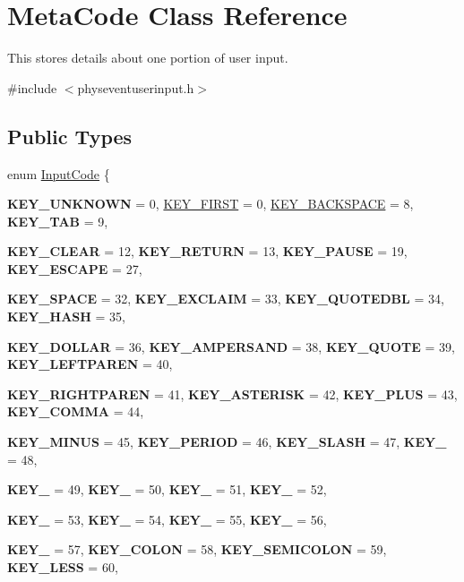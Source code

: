 \hypertarget{classMetaCode}{
\section{MetaCode Class Reference}
\label{d7/d72/classMetaCode}
}


This stores details about one portion of user input.  


{\ttfamily \#include $<$physeventuserinput.h$>$}\subsection*{Public Types}
\begin{DoxyCompactItemize}
\item 
enum \hyperlink{classMetaCode_a7390e6f58e25c0ce377bba4e63081b24}{InputCode} \{ \par
{\bfseries KEY\_\-UNKNOWN} =  0, 
\hyperlink{classMetaCode_a7390e6f58e25c0ce377bba4e63081b24af7c19e29f8e1299858f9a9a0e2e0df32}{KEY\_\-FIRST} =  0, 
\hyperlink{classMetaCode_a7390e6f58e25c0ce377bba4e63081b24a11be427f22c538fc5682e0b7fa3e1e6d}{KEY\_\-BACKSPACE} =  8, 
{\bfseries KEY\_\-TAB} =  9, 
\par
{\bfseries KEY\_\-CLEAR} =  12, 
{\bfseries KEY\_\-RETURN} =  13, 
{\bfseries KEY\_\-PAUSE} =  19, 
{\bfseries KEY\_\-ESCAPE} =  27, 
\par
{\bfseries KEY\_\-SPACE} =  32, 
{\bfseries KEY\_\-EXCLAIM} =  33, 
{\bfseries KEY\_\-QUOTEDBL} =  34, 
{\bfseries KEY\_\-HASH} =  35, 
\par
{\bfseries KEY\_\-DOLLAR} =  36, 
{\bfseries KEY\_\-AMPERSAND} =  38, 
{\bfseries KEY\_\-QUOTE} =  39, 
{\bfseries KEY\_\-LEFTPAREN} =  40, 
\par
{\bfseries KEY\_\-RIGHTPAREN} =  41, 
{\bfseries KEY\_\-ASTERISK} =  42, 
{\bfseries KEY\_\-PLUS} =  43, 
{\bfseries KEY\_\-COMMA} =  44, 
\par
{\bfseries KEY\_\-MINUS} =  45, 
{\bfseries KEY\_\-PERIOD} =  46, 
{\bfseries KEY\_\-SLASH} =  47, 
{\bfseries KEY\_} =  48, 
\par
{\bfseries KEY\_} =  49, 
{\bfseries KEY\_} =  50, 
{\bfseries KEY\_} =  51, 
{\bfseries KEY\_} =  52, 
\par
{\bfseries KEY\_} =  53, 
{\bfseries KEY\_} =  54, 
{\bfseries KEY\_} =  55, 
{\bfseries KEY\_} =  56, 
\par
{\bfseries KEY\_} =  57, 
{\bfseries KEY\_\-COLON} =  58, 
{\bfseries KEY\_\-SEMICOLON} =  59, 
{\bfseries KEY\_\-LESS} =  60, 
\par

\end{DoxyCompactItemize}
